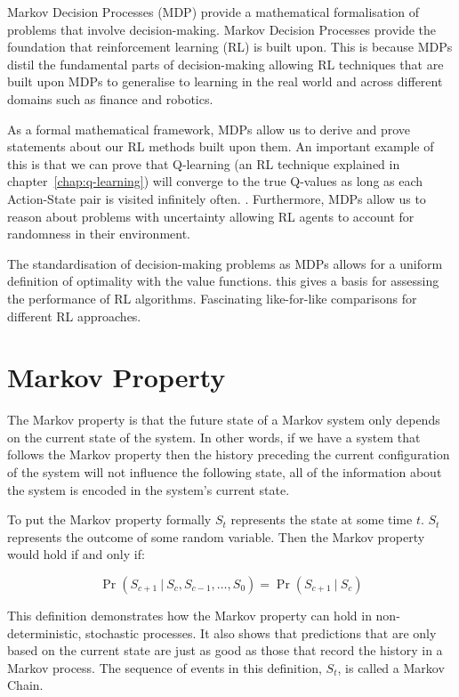 \documentclass[]{final_report}
\begin{document}
Markov Decision Processes (MDP) provide a mathematical formalisation of problems that involve decision-making. Markov Decision Processes provide the foundation that reinforcement learning (RL) is built upon. This is because MDPs distil the fundamental parts of decision-making allowing RL techniques that are built upon MDPs to generalise to learning in the real world and across different domains such as finance and robotics. 

As a formal mathematical framework, MDPs allow us to derive and prove statements about our RL methods built upon them. An important example of this is that we can prove that Q-learning (an RL technique explained in chapter~\ref{chap:q-learning}) will converge to the true Q-values as long as each Action-State pair is visited infinitely often. \cite{watkins1992q}. Furthermore, MDPs allow us to reason about problems with uncertainty allowing RL agents to account for randomness in their environment. 

The standardisation of decision-making problems as MDPs allows for a uniform definition of optimality with the value functions. this gives a basis for assessing the performance of RL algorithms. Fascinating like-for-like comparisons for different RL approaches. 


\section{Markov Property}

The Markov property is that the future state of a Markov system only depends on the current state of the system. In other words, if we have a system that follows the Markov property then the history preceding the current configuration of the system will not influence the following state, all of the information about the system is encoded in the system's current state. 

To put the Markov property formally $S_t$ represents the state at some time $t$. $S_t$ represents the outcome of some random variable. Then the Markov property would hold if and only if:

$$\Pr(S_{c+1}\ |\ S_{c},S_{c-1},\dots,S_0) = \Pr(S_{c+1}\ |\ S_{c})$$

This definition demonstrates how the Markov property can hold in non-deterministic, stochastic processes. It also shows that predictions that are only based on the current state are just as good as those that record the history in a Markov process. The sequence of events in this definition, $S_t$, is called a Markov Chain\cite{meyn2012markov}.
\end{document}
